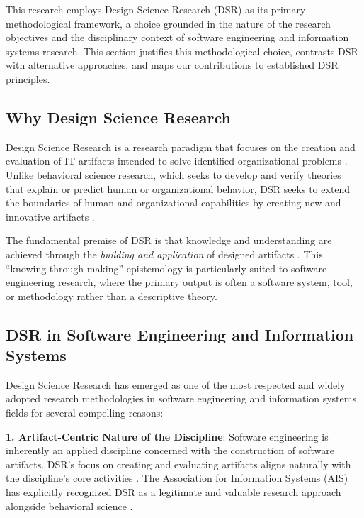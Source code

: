 \label{sec:methodology}

This research employs Design Science Research (DSR) as its primary methodological framework, a choice grounded in the nature of the research objectives and the disciplinary context of software engineering and information systems research. This section justifies this methodological choice, contrasts DSR with alternative approaches, and maps our contributions to established DSR principles.

\subsection{Why Design Science Research}

Design Science Research is a research paradigm that focuses on the creation and evaluation of IT artifacts intended to solve identified organizational problems \cite{hevner2004design}. Unlike behavioral science research, which seeks to develop and verify theories that explain or predict human or organizational behavior, DSR seeks to extend the boundaries of human and organizational capabilities by creating new and innovative artifacts \cite{hevner2004design, march1995design}.

The fundamental premise of DSR is that knowledge and understanding are achieved through the \textit{building and application} of designed artifacts \cite{simon1996sciences}. This ``knowing through making'' epistemology is particularly suited to software engineering research, where the primary output is often a software system, tool, or methodology rather than a descriptive theory.

\subsection{DSR in Software Engineering and Information Systems}

Design Science Research has emerged as one of the most respected and widely adopted research methodologies in software engineering and information systems fields for several compelling reasons:

\textbf{1. Artifact-Centric Nature of the Discipline}: Software engineering is inherently an applied discipline concerned with the construction of software artifacts. DSR's focus on creating and evaluating artifacts aligns naturally with the discipline's core activities \cite{heistracher2004design}. The Association for Information Systems (AIS) has explicitly recognized DSR as a legitimate and valuable research approach alongside behavioral science \cite{hevner2004design}.

